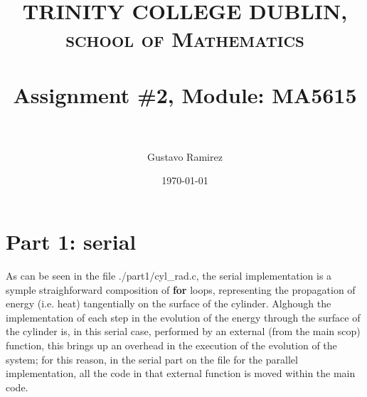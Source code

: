 \documentclass[paper=a4, fontsize=11pt]{scrartcl} %
\title{	
\normalfont \normalsize 
\textsc{TRINITY COLLEGE DUBLIN, school of Mathematics} \\ [25pt] %
\horrule{0.5pt} \\[0.4cm] %
\huge Assignment \#2, Module: MA5615 \\ %
\horrule{2pt} \\[0.5cm] %
}
\author{Gustavo Ramirez} %
\date{\normalsize\today} %
\numberwithin{equation}{section} %
\numberwithin{figure}{section} %
\numberwithin{table}{section} %
\begin{document}
\maketitle %


\begin{comment}
\section{Problem description}

\begin{enumerate}
\item 
\item 
\item 
\item 
\end{enumerate}

\end{comment}

\newpage


\begin{comment}

USEFUL LINKS:

official sources for terminology:
-----
http://www.intel.com/content/www/us/en/support/topics/glossary.html
https://www-01.ibm.com/software/globalization/terminology/a.html
-----




about IMB processors:
-----

insert in google: list of ibm processors
https://en.wikipedia.org/wiki/List_of_IBM_products
https://www-01.ibm.com/software/passportadvantage/guide_to_identifying_processor_family.html
http://www.nextplatform.com/2015/08/10/ibm-roadmap-extends-power-chips-to-2020-and-beyond/
http://www.theverge.com/2015/7/9/8919091/ibm-7nm-transistor-processor
https://www.ibm.com/developerworks/ibmi/library/i-ibmi-7_2-and-ibm-power8/
-----




\end{comment}


\section{Part 1: serial}

As can be seen in the file ./part1/cyl\_rad.c, the serial implementation is a symple straighforward composition of \textbf{for} loops, representing the propagation of energy (i.e. heat) tangentially on the surface of the cylinder. Alghough the implementation of each step in the evolution of the energy through the surface of the cylinder is, in this serial case, performed by an external (from the main scop) function, this brings up an overhead in the execution of the evolution of the system; for this reason, in the serial part on the file for the parallel implementation, all the code in that external function is moved within the main code.
\end{document}
